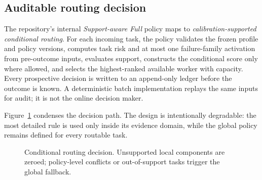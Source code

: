 \subsection{Auditable routing decision}

The repository's internal \emph{Support-aware Full} policy maps to \emph{calibration-supported conditional routing}. For each incoming task, the policy validates the frozen profile and policy versions, computes task risk and at most one failure-family activation from pre-outcome inputs, evaluates support, constructs the conditional score only where allowed, and selects the highest-ranked available worker with capacity. Every prospective decision is written to an append-only ledger before the outcome is known. A deterministic batch implementation replays the same inputs for audit; it is not the online decision maker.

Figure~\ref{fig:routing} condenses the decision path. The design is intentionally degradable: the most detailed rule is used only inside its evidence domain, while the global policy remains defined for every routable task.

\begin{figure}[t]
\centering
{}
\caption{Conditional routing decision. Unsupported local components are zeroed; policy-level conflicts or out-of-support tasks trigger the global fallback.}
\label{fig:routing}
\end{figure}
